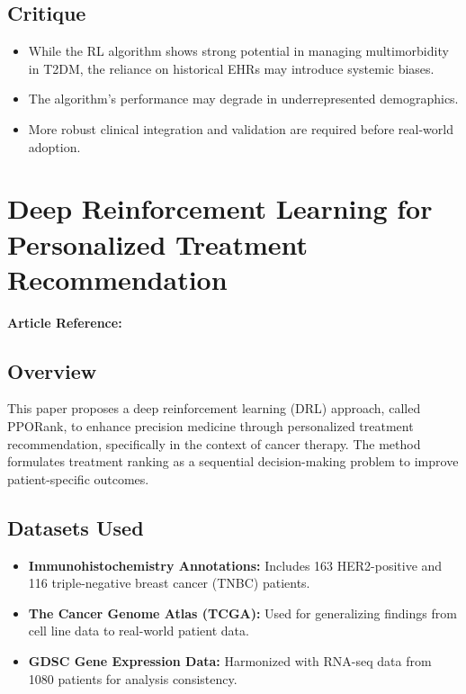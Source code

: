\subsection*{Critique}
\begin{itemize}
    \item While the RL algorithm shows strong potential in managing multimorbidity in T2DM, the reliance on historical EHRs may introduce systemic biases.
    \item The algorithm's performance may degrade in underrepresented demographics.
    \item More robust clinical integration and validation are required before real-world adoption.
\end{itemize}

\section{Deep Reinforcement Learning for Personalized Treatment Recommendation}
\textbf{Article Reference:} \cite{liuDeepReinforcementLearning2022}

\subsection*{Overview}
This paper proposes a deep reinforcement learning (DRL) approach, called PPORank, to enhance precision medicine through personalized treatment recommendation, specifically in the context of cancer therapy. The method formulates treatment ranking as a sequential decision-making problem to improve patient-specific outcomes.

\subsection*{Datasets Used}
\begin{itemize}
    \item \textbf{Immunohistochemistry Annotations:} Includes 163 HER2-positive and 116 triple-negative breast cancer (TNBC) patients.
    \item \textbf{The Cancer Genome Atlas (TCGA):} Used for generalizing findings from cell line data to real-world patient data.
    \item \textbf{GDSC Gene Expression Data:} Harmonized with RNA-seq data from 1080 patients for analysis consistency.
\end{itemize}

